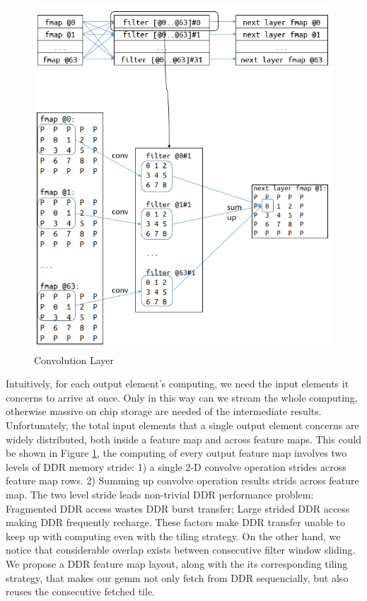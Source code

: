 \documentclass{acm_proc_article-sp-copy}
\begin{document}
\begin{figure}
	\centering
	\includegraphics[width=1.0\linewidth]{./figure/z/cnn.png}
	\caption{Convolution Layer}
	\label{cnn}
\end{figure}

Intuitively, for each output element's computing, we need the input elements it concerns to arrive at once. Only in this way can we stream the whole computing, otherwise massive on chip storage are needed of the intermediate results.
Unfortunately, the total input elements that a single output element concerns are widely distributed, both inside a feature map and across feature maps. This could be shown in Figure \ref{cnn}, the computing of every output feature map involves two levels of DDR memory stride: 
1) a single 2-D convolve operation strides across feature map rows.
2) Summing up convolve operation results strids across feature map.
The two level stride leads non-trivial DDR performance problem: Fragmented DDR access wastes DDR burst transfer; Large strided DDR access making DDR frequently recharge. These factors make DDR transfer unable to keep up with computing even with the tiling strategy.
On the other hand, we notice that considerable overlap exists between consecutive filter window sliding. We propose a DDR feature map layout, along with the its corresponding tiling strategy,
that makes our gemm not only fetch from DDR sequencially, but also reuses the consecutive fetched tile.
\end{document}
